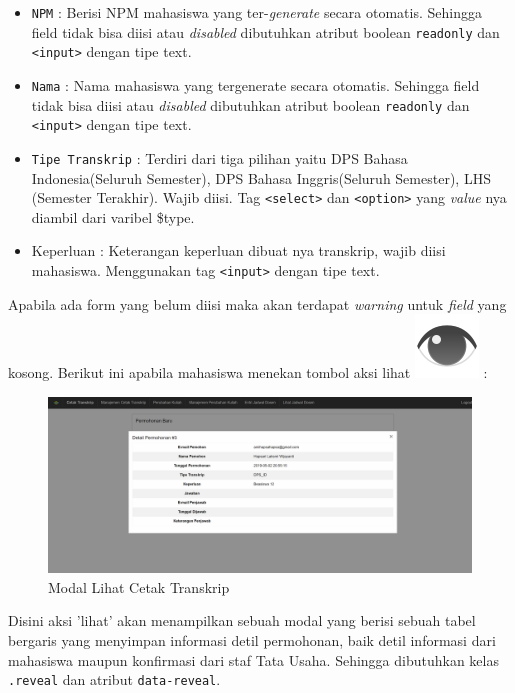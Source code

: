 \documentclass[a4paper,twoside]{article}
\begin{document}
\begin{enumerate}
\begin{itemize}
			\item \texttt{NPM} : Berisi NPM mahasiswa yang ter-\textit{generate} secara otomatis. Sehingga field tidak bisa diisi atau \textit{disabled} dibutuhkan atribut boolean \verb|readonly| dan \texttt{<input>} dengan tipe text.
			\item \texttt{Nama} : Nama mahasiswa yang tergenerate secara otomatis. Sehingga field tidak bisa diisi atau \textit{disabled} dibutuhkan atribut boolean \verb|readonly| dan \texttt{<input>} dengan tipe text.
			\item \texttt{Tipe Transkrip} : Terdiri dari tiga pilihan yaitu DPS Bahasa Indonesia(Seluruh Semester), DPS Bahasa Inggris(Seluruh Semester), LHS (Semester Terakhir). Wajib diisi. Tag \texttt{<select>} dan \texttt{<option>} yang \textit{value} nya diambil dari varibel \$type.
			\item Keperluan : Keterangan keperluan dibuat nya transkrip, wajib diisi mahasiswa. Menggunakan tag \texttt{<input>} dengan tipe text.
		\end{itemize}
		Apabila ada form yang belum diisi maka akan terdapat \textit{warning} untuk \textit{field} yang kosong.
		Berikut ini apabila mahasiswa menekan tombol aksi lihat \includegraphics[height=0.7\baselineskip]{tombol_eye.png} :
		\begin{figure} [H]
			\centering  
			\includegraphics[scale=0.5]{Modal-Lihat-Cetak-Transkrip.png}  
			\caption{Modal Lihat Cetak Transkrip} 
		\end{figure}
		\noindent Disini aksi 'lihat' akan menampilkan sebuah modal yang berisi sebuah tabel bergaris yang menyimpan informasi detil permohonan, baik detil informasi dari mahasiswa maupun konfirmasi dari staf Tata Usaha. Sehingga dibutuhkan kelas \verb|.reveal| dan atribut \verb|data-reveal|.
		

\end{enumerate}
\end{document}
